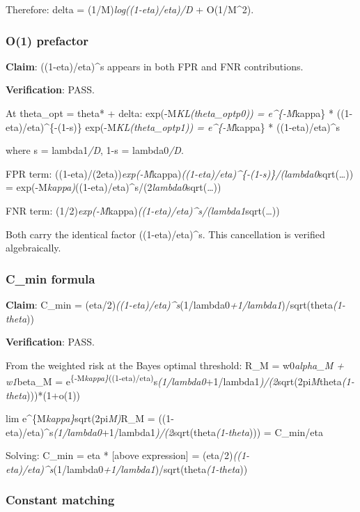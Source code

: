 \documentclass[
  12pt,
]{article}
\begin{document}
Therefore: delta = (1/M)\emph{log((1-eta)/eta)/D} + O(1/M\^{}2).

\subsubsection{O(1) prefactor}\label{o1-prefactor}

\textbf{Claim}: ((1-eta)/eta)\^{}s appears in both FPR and FNR
contributions.

\textbf{Verification}: PASS.

At theta\_opt = theta* + delta:
exp(-M\emph{KL(theta\_opt\textbar\textbar p0)) = e\^{}\{-M}kappa\} *
((1-eta)/eta)\^{}\{-(1-s)\}
exp(-M\emph{KL(theta\_opt\textbar\textbar p1)) = e\^{}\{-M}kappa\} *
((1-eta)/eta)\^{}s

where s = \textbar lambda1\emph{\textbar/D}, 1-s = lambda0\emph{/D}.

FPR term:
((1-eta)/(2eta))\emph{exp(-M}kappa)\emph{((1-eta)/eta)\^{}\{-(1-s)\}/(lambda0}sqrt(\ldots))
= exp(-M\emph{kappa)}((1-eta)/eta)\^{}s/(2\emph{lambda0}sqrt(\ldots))

FNR term:
(1/2)\emph{exp(-M}kappa)\emph{((1-eta)/eta)\^{}s/(\textbar lambda1}\textbar*sqrt(\ldots))

Both carry the identical factor ((1-eta)/eta)\^{}s. This cancellation is
verified algebraically.

\subsubsection{C\_min formula}\label{c_min-formula}

\textbf{Claim}: C\_min =
(eta/2)\emph{((1-eta)/eta)\^{}s}(1/lambda0\emph{+1/\textbar lambda1}\textbar)/sqrt(theta\emph{(1-theta}))

\textbf{Verification}: PASS.

From the weighted risk at the Bayes optimal threshold: R\_M =
w0\emph{alpha\_M + w1}beta\_M =
e\textsuperscript{\{-M\emph{kappa\}}((1-eta)/eta)}s\emph{(1/lambda0}+1/\textbar lambda1\emph{\textbar)/(2}sqrt(2pi\emph{M}theta\emph{(1-theta})))*(1+o(1))

lim e\^{}\{M\emph{kappa\}}sqrt(2pi\emph{M)}R\_M =
((1-eta)/eta)\^{}s\emph{(1/lambda0}+1/\textbar lambda1\emph{\textbar)/(2}sqrt(theta\emph{(1-theta})))
= C\_min/eta

Solving: C\_min = eta * {[}above expression{]} =
(eta/2)\emph{((1-eta)/eta)\^{}s}(1/lambda0\emph{+1/\textbar lambda1}\textbar)/sqrt(theta\emph{(1-theta}))

\subsubsection{Constant matching}\label{constant-matching}
\end{document}
